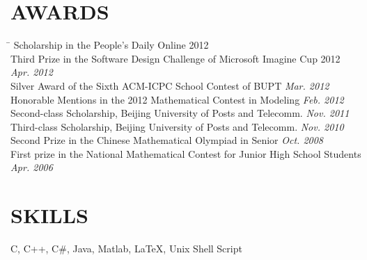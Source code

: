\documentclass[margin]{res}
\begin{document}
\begin{resume}
\section{AWARDS}
\vspace{-0.05in}
\begin{tabbing}
\hspace{4.7in}\= \kill
Scholarship in the People's Daily Online 2012   \\[7pt]
Third Prize in the Software Design Challenge of Microsoft Imagine Cup 2012 \\ \> {\em Apr. 2012} \\[7pt]
Silver Award of the Sixth ACM-ICPC School Contest of BUPT \> {\em Mar. 2012} \\[7pt]
Honorable Mentions in the 2012 Mathematical Contest in Modeling \> {\em Feb. 2012} \\[7pt]
Second-class Scholarship, Beijing University of Posts and Telecomm. \> {\em Nov. 2011} \\[7pt]
Third-class Scholarship, Beijing University of Posts and Telecomm. \> {\em Nov. 2010} \\[7pt]
Second Prize in the Chinese Mathematical Olympiad in Senior \> {\em Oct. 2008} \\[7pt]
First prize in the National Mathematical Contest for Junior High School Students \\ \> {\em Apr. 2006}
\end{tabbing}

\section{SKILLS}
C, C++, C\#, Java, Matlab, \LaTeX, Unix Shell Script

\end{resume}
\end{document}
